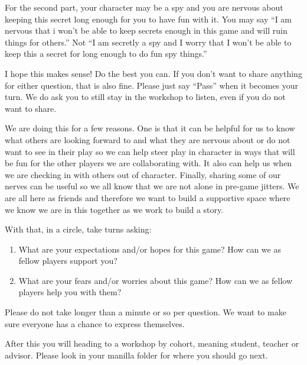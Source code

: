 \documentclass[green]{GL2020}
\begin{document}
For the second part, your character may be a spy  and you are nervous about keeping this secret long enough for you to have fun with it.  You may say ``I am nervous that i won’t be able to keep secrets enough in this game and will ruin things for others.''  Not ``I am secretly a spy and I worry that I won’t be able to keep this a secret for long enough to do fun spy things.''

I hope this makes sense!  Do the best you can.  If you don’t want to share anything for either question, that is also fine.  Please just say ``Pass'' when it becomes your turn.  We do ask you to still stay in the workshop to listen, even if you do not want to share.

We are doing this for a few reasons.  One is that it can be helpful for us to know what others are looking forward to and what they are nervous about or do not want to see in their play so we can help steer play in character in ways that will be fun for the other players we are collaborating with.  It also can help us when we are checking in with others out of character.  Finally, sharing some of our nerves can be useful so we all know that we are not alone in pre-game jitters.  We are all here as friends and therefore we want to build a supportive space where we know we are in this together as we work to build a story.

With that, in a circle, take turns asking:
\begin{enumerate}
\item What are your expectations and/or hopes for this game?  How can we as fellow players support you?
\item What are your fears and/or worries about this game?  How can we as fellow players help you with them? 
\end{enumerate}

Please do not take longer than a minute or so per question.  We want to make sure everyone has a chance to express themselves.

After this you will heading to a workshop by cohort, meaning student, teacher or advisor.  Please look in your manilla folder for where you should go next.
\end{document}
